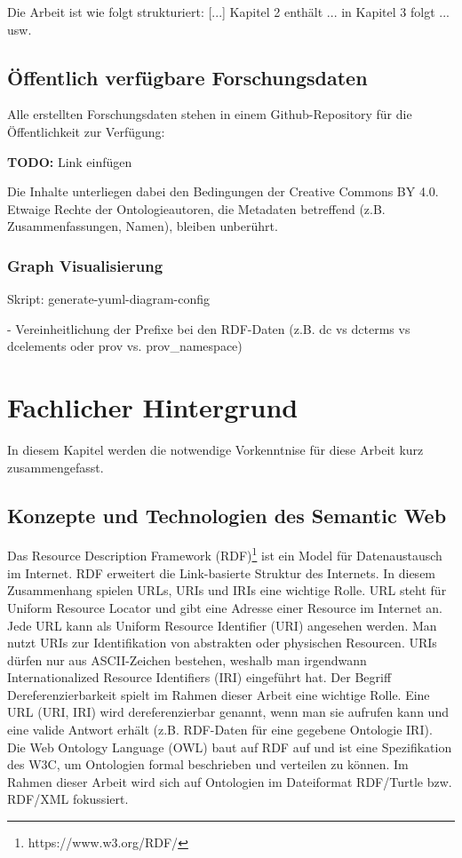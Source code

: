 \documentclass{article}
\begin{document}
Die Arbeit ist wie folgt strukturiert: [...] Kapitel 2 enthält ... in Kapitel 3 folgt ... usw.

\subsection{Öffentlich verfügbare Forschungsdaten}

Alle erstellten Forschungsdaten stehen in einem Github-Repository für die Öffentlichkeit zur Verfügung:

\textbf{TODO:} Link einfügen

Die Inhalte unterliegen dabei den Bedingungen der Creative Commons BY 4.0.
Etwaige Rechte der Ontologieautoren, die Metadaten betreffend (z.B. Zusammenfassungen, Namen), bleiben unberührt.

\subsubsection{Graph Visualisierung}

Skript: generate-yuml-diagram-config

- Vereinheitlichung der Prefixe bei den RDF-Daten (z.B. dc vs dcterms vs dcelements oder prov vs. prov\_namespace)

\section{Fachlicher Hintergrund}

In diesem Kapitel werden die notwendige Vorkenntnise für diese Arbeit kurz zusammengefasst.

\subsection{Konzepte und Technologien des Semantic Web}

Das Resource Description Framework (RDF)\footnote{https://www.w3.org/RDF/} ist ein Model für Datenaustausch im Internet.
RDF erweitert die Link-basierte Struktur des Internets.
In diesem Zusammenhang spielen URLs, URIs und IRIs eine wichtige Rolle.
URL steht für Uniform Resource Locator und gibt eine Adresse einer Resource im Internet an.
Jede URL kann als Uniform Resource Identifier (URI) angesehen werden.
Man nutzt URIs zur Identifikation von abstrakten oder physischen Resourcen.
URIs dürfen nur aus ASCII-Zeichen bestehen, weshalb man irgendwann Internationalized Resource Identifiers (IRI) eingeführt hat.
Der Begriff Dereferenzierbarkeit spielt im Rahmen dieser Arbeit eine wichtige Rolle.
Eine URL (URI, IRI) wird dereferenzierbar genannt, wenn man sie aufrufen kann und eine valide Antwort erhält (z.B. RDF-Daten für eine gegebene Ontologie IRI).
Die Web Ontology Language (OWL) baut auf RDF auf und ist eine Spezifikation des W3C, um Ontologien formal beschrieben und verteilen zu können.
Im Rahmen dieser Arbeit wird sich auf Ontologien im Dateiformat RDF/Turtle bzw. RDF/XML fokussiert.
\end{document}
